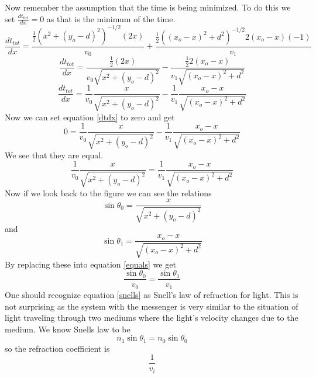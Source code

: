 \documentclass[11pt]{article}
\numberwithin{equation}{section}
\begin{document}
Now remember the assumption that the time is being minimized. To do this we set $\frac{d t_{tot}}{dx} = 0$ as that is the minimum of the time.
$$\frac{d t_{tot}}{dx} = \frac{\frac{1}{2}(x^2 + (y_o - d)^2)^{-1/2} (2x)}{v_0} + \frac{\frac{1}{2}((x_o - x)^2 + d^2)^{-1/2}2(x_o - x)(-1)}{v_1}$$
$$\frac{d t_{tot}}{dx} = \frac{\frac{1}{2}(2x)}{v_0 \sqrt{x^2 + (y_o - d)^2}} - \frac{\frac{1}{2}2(x_o -x)} {v_1 \sqrt{(x_o - x)^2 + d^2}}$$
\begin{equation}
\frac{d t_{tot}}{dx} = \frac{1}{v_0}\frac{x}{\sqrt{x^2 + (y_o - d)^2}} - \frac{1}{v_1}\frac{x_o -x} {\sqrt{(x_o - x)^2 + d^2}}
\label{dtdx}
\end{equation}
Now we can set equation \ref{dtdx} to zero and get
$$0 = \frac{1}{v_0}\frac{x}{\sqrt{x^2 + (y_o - d)^2}} - \frac{1}{v_1}\frac{x_o -x} {\sqrt{(x_o - x)^2 + d^2}}$$
We see that they are equal.
\begin{equation}
\frac{1}{v_0}\frac{x}{\sqrt{x^2 + (y_o - d)^2}} = \frac{1}{v_1}\frac{x_o -x} {\sqrt{(x_o - x)^2 + d^2}}
\label{equals}
\end{equation}
Now if we look back to the figure we can see the relations
$$\sin{\theta_0} = \frac{x}{\sqrt{x^2 + (y_o - d)^2}}$$
and
$$\sin{\theta_1} = \frac{x_o -x} {\sqrt{(x_o - x)^2 + d^2}}$$
By replacing these into equation \ref{equals} we get
\begin{equation}
\frac{\sin{\theta_0}}{v_0} = \frac{\sin{\theta_1}}{v_1}  
\label{snells}
\end{equation}
One should recognize equation \ref{snells} as Snell's law of refraction for light. This is not surprising as the system with the messenger is very similar to the situation of light traveling through two mediums where the light's velocity changes due to the medium. We know Snells law to be 
$$n_1 \sin{\theta_1} = n_0 \sin{\theta_0}$$
so the refraction coefficient is $$\frac{1}{v_i}$$
\end{document}
